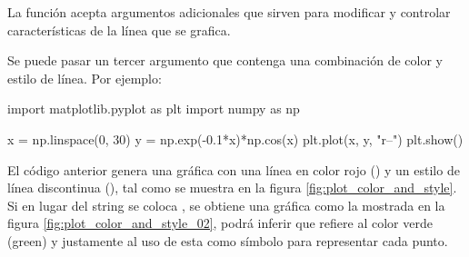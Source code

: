 La función  acepta argumentos adicionales que sirven para modificar y controlar características de 
la línea que se grafica. 

Se puede pasar un tercer argumento que contenga una combinación de color y estilo de línea. Por ejemplo:

\begin{python}
import matplotlib.pyplot as plt
import numpy as np

x = np.linspace(0, 30)
y = np.exp(-0.1*x)*np.cos(x)
plt.plot(x, y, "r--")
plt.show()
\end{python}

El código anterior genera una gráfica con una línea en color rojo () y un estilo de línea discontinua 
(\code{-{}-}), tal como se muestra en la figura \ref{fig:plot_color_and_style}. Si en lugar 
del string  se coloca , se obtiene una gráfica como la mostrada en la 
figura \ref{fig:plot_color_and_style_02}, podrá inferir que  refiere al color 
verde (green) y  justamente al uso de esta como símbolo para representar cada punto.

